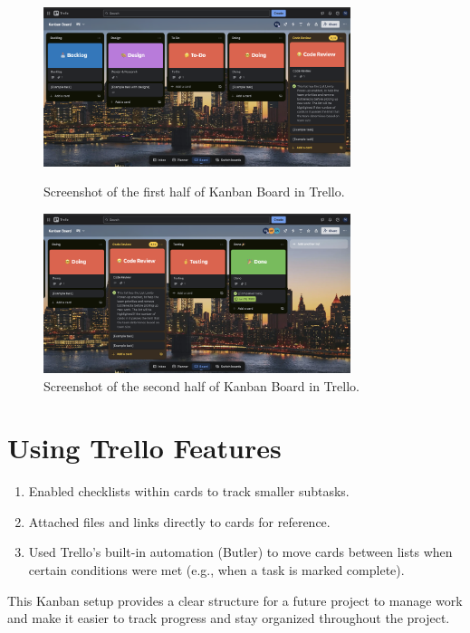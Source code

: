 \begin{figure}[h!]
    \centering
    \includegraphics[width=0.8\textwidth]{kanban_board.png}
    \caption{Screenshot of the first half of Kanban Board in Trello.}
    \label{fig:kanban_board}
    
    \vspace{0.5cm} %
    
    \includegraphics[width=0.8\textwidth]{kanban_board2.png}
    \caption{Screenshot of the second half of Kanban Board in Trello.}
    \label{fig:kanban_board2}
\end{figure}


\section{Using Trello Features}
\begin{enumerate}
    \item Enabled checklists within cards to track smaller subtasks.
    \item Attached files and links directly to cards for reference.
    \item Used Trello’s built-in automation (Butler) to move cards between lists when certain conditions were met (e.g., when a task is marked complete).
\end{enumerate}

This Kanban setup provides a clear structure for a future project to manage work and make it easier to track progress and stay organized throughout the project.

